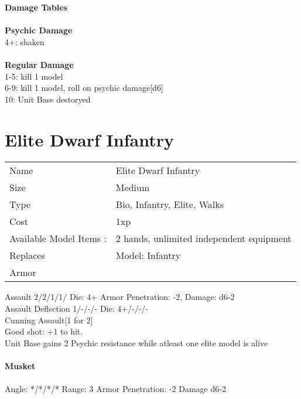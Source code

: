 {\bf Damage Tables} \\
\ \\ {\bf Psychic Damage } \\
4+: shaken \\
\ \\ {\bf Regular Damage } \\
1-5: kill 1 model \\
6-9: kill 1 model, roll on psychic damage[d6] \\
10: Unit Base destoryed \\









\pagebreak

\section{ Elite Dwarf Infantry }

\begin{tabular}{ll}
  Name & Elite Dwarf Infantry \\
  Size & Medium\\
  Type & Bio, Infantry, Elite, Walks\\
  Cost & 1xp\\
  Available Model Items : &2 hands, unlimited independent equipment\\
  Replaces & Model: Infantry\\
  Armor & 
\end{tabular}



Assault 2/2/1/1/ Die: 4+ Armor Penetration: -2, Damage: d6-2 \\
Assault Deflection 1/-/-/- Die: 4+/-/-/-\\
Cunning Assault[1 for 2]
\ \\

Good shot: +1 to hit. \\ Unit Base gains 2 Psychic resistance while atleast one elite model is alive \\

\ \\
{\bf Musket } \\
\ \\
Angle: */*/*/* Range: 3 Armor Penetration: -2 Damage d6-2 \\
\indent  \\





